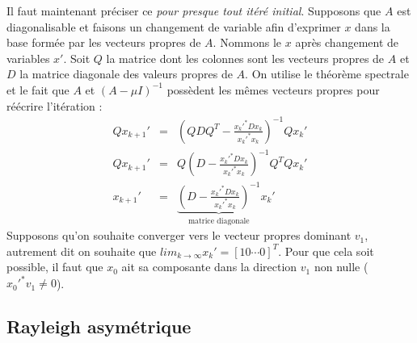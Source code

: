 Il faut maintenant préciser ce \textit{pour presque tout itéré initial}. Supposons que $A$ est diagonalisable et faisons un changement de variable afin d'exprimer $x$ dans la base formée par les vecteurs propres de $A$. Nommons le $x$ après changement de variables $x'$. Soit $Q$ la matrice dont les colonnes sont les vecteurs propres de $A$ et $D$ la matrice diagonale des valeurs propres de $A$. On utilise le théorème spectrale et le fait que $A$ et $(A-\mu I)^{-1}$ possèdent les mêmes vecteurs propres pour réécrire l'itération : 
\begin{eqnarray}
Qx_{k+1}' & = &(Q D Q^T - \frac{x_k'^* D x_k}{x_k'^* x_k})^{-1} Qx_{k}'\\
Qx_{k+1}' & = & Q(D-\frac{x_k'^* D x_k}{x_k'^* x_k})^{-1}Q^T Qx_k'\\
x_{k+1}' & = & \underbrace{(D-\frac{x_k'^* D x_k}{x_k'^* x_k})^{-1}}_{\text{matrice diagonale}} x_k'
\end{eqnarray}
Supposons qu'on souhaite converger vers le vecteur propres dominant $v_1$, autrement dit on souhaite que $lim_{k\rightarrow \infty} x_k' = [1 0 \cdots 0]^T$. Pour que cela soit possible, il faut que $x_0$ ait sa composante dans la direction $v_1$ non nulle ($x_0'^* v_1 \neq 0$). 

\subsection*{Rayleigh asymétrique}